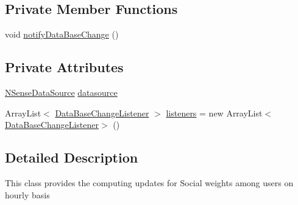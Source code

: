\subsection*{Private Member Functions}
\begin{DoxyCompactItemize}
\item 
void \hyperlink{classcs_1_1nsense_1_1bluetooth_1_1_on_new_hour_update_aa1ec18bb3587fdcedeb72316cabfd403}{notify\-Data\-Base\-Change} ()
\end{DoxyCompactItemize}
\subsection*{Private Attributes}
\begin{DoxyCompactItemize}
\item 
\hyperlink{classcs_1_1nsense_1_1db_1_1_n_sense_data_source}{N\-Sense\-Data\-Source} \hyperlink{classcs_1_1nsense_1_1bluetooth_1_1_on_new_hour_update_ad2b435c849101095e6dba4a2a98114b9}{datasource}
\item 
Array\-List$<$ \hyperlink{interfacecs_1_1nsense_1_1db_1_1_data_base_change_listener}{Data\-Base\-Change\-Listener} $>$ \hyperlink{classcs_1_1nsense_1_1bluetooth_1_1_on_new_hour_update_a3093596cccb264d41d61b3dc82b1a7ba}{listeners} = new Array\-List$<$\hyperlink{interfacecs_1_1nsense_1_1db_1_1_data_base_change_listener}{Data\-Base\-Change\-Listener}$>$ ()
\end{DoxyCompactItemize}


\subsection{Detailed Description}
This class provides the computing updates for Social weights among users on hourly basis 

